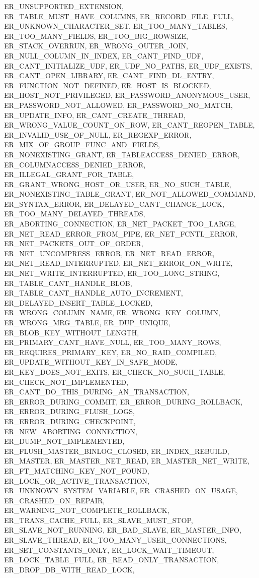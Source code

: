 \documentclass[english,letterpaper]{book}
\begin{document}
\begin{Code}
   ER_UNSUPPORTED_EXTENSION,
   ER_TABLE_MUST_HAVE_COLUMNS,
   ER_RECORD_FILE_FULL,
   ER_UNKNOWN_CHARACTER_SET,
   ER_TOO_MANY_TABLES,
   ER_TOO_MANY_FIELDS,
   ER_TOO_BIG_ROWSIZE,
   ER_STACK_OVERRUN,
   ER_WRONG_OUTER_JOIN,
   ER_NULL_COLUMN_IN_INDEX,
   ER_CANT_FIND_UDF,
   ER_CANT_INITIALIZE_UDF,
   ER_UDF_NO_PATHS,
   ER_UDF_EXISTS,
   ER_CANT_OPEN_LIBRARY,
   ER_CANT_FIND_DL_ENTRY,
   ER_FUNCTION_NOT_DEFINED,
   ER_HOST_IS_BLOCKED,
   ER_HOST_NOT_PRIVILEGED,
   ER_PASSWORD_ANONYMOUS_USER,
   ER_PASSWORD_NOT_ALLOWED,
   ER_PASSWORD_NO_MATCH,
   ER_UPDATE_INFO,
   ER_CANT_CREATE_THREAD,
   ER_WRONG_VALUE_COUNT_ON_ROW,
   ER_CANT_REOPEN_TABLE,
   ER_INVALID_USE_OF_NULL,
   ER_REGEXP_ERROR,
   ER_MIX_OF_GROUP_FUNC_AND_FIELDS,
   ER_NONEXISTING_GRANT,
   ER_TABLEACCESS_DENIED_ERROR,
   ER_COLUMNACCESS_DENIED_ERROR,
   ER_ILLEGAL_GRANT_FOR_TABLE,
   ER_GRANT_WRONG_HOST_OR_USER,
   ER_NO_SUCH_TABLE,
   ER_NONEXISTING_TABLE_GRANT,
   ER_NOT_ALLOWED_COMMAND,
   ER_SYNTAX_ERROR,
   ER_DELAYED_CANT_CHANGE_LOCK,
   ER_TOO_MANY_DELAYED_THREADS,
   ER_ABORTING_CONNECTION,
   ER_NET_PACKET_TOO_LARGE,
   ER_NET_READ_ERROR_FROM_PIPE,
   ER_NET_FCNTL_ERROR,
   ER_NET_PACKETS_OUT_OF_ORDER,
   ER_NET_UNCOMPRESS_ERROR,
   ER_NET_READ_ERROR,
   ER_NET_READ_INTERRUPTED,
   ER_NET_ERROR_ON_WRITE,
   ER_NET_WRITE_INTERRUPTED,
   ER_TOO_LONG_STRING,
   ER_TABLE_CANT_HANDLE_BLOB,
   ER_TABLE_CANT_HANDLE_AUTO_INCREMENT,
   ER_DELAYED_INSERT_TABLE_LOCKED,
   ER_WRONG_COLUMN_NAME,
   ER_WRONG_KEY_COLUMN,
   ER_WRONG_MRG_TABLE,
   ER_DUP_UNIQUE,
   ER_BLOB_KEY_WITHOUT_LENGTH,
   ER_PRIMARY_CANT_HAVE_NULL,
   ER_TOO_MANY_ROWS,
   ER_REQUIRES_PRIMARY_KEY,
   ER_NO_RAID_COMPILED,
   ER_UPDATE_WITHOUT_KEY_IN_SAFE_MODE,
   ER_KEY_DOES_NOT_EXITS,
   ER_CHECK_NO_SUCH_TABLE,
   ER_CHECK_NOT_IMPLEMENTED,
   ER_CANT_DO_THIS_DURING_AN_TRANSACTION,
   ER_ERROR_DURING_COMMIT,
   ER_ERROR_DURING_ROLLBACK,
   ER_ERROR_DURING_FLUSH_LOGS,
   ER_ERROR_DURING_CHECKPOINT,
   ER_NEW_ABORTING_CONNECTION,
   ER_DUMP_NOT_IMPLEMENTED,
   ER_FLUSH_MASTER_BINLOG_CLOSED,
   ER_INDEX_REBUILD,
   ER_MASTER,
   ER_MASTER_NET_READ,
   ER_MASTER_NET_WRITE,
   ER_FT_MATCHING_KEY_NOT_FOUND,
   ER_LOCK_OR_ACTIVE_TRANSACTION,
   ER_UNKNOWN_SYSTEM_VARIABLE,
   ER_CRASHED_ON_USAGE,
   ER_CRASHED_ON_REPAIR,
   ER_WARNING_NOT_COMPLETE_ROLLBACK,
   ER_TRANS_CACHE_FULL,
   ER_SLAVE_MUST_STOP,
   ER_SLAVE_NOT_RUNNING,
   ER_BAD_SLAVE,
   ER_MASTER_INFO,
   ER_SLAVE_THREAD,
   ER_TOO_MANY_USER_CONNECTIONS,
   ER_SET_CONSTANTS_ONLY,
   ER_LOCK_WAIT_TIMEOUT,
   ER_LOCK_TABLE_FULL,
   ER_READ_ONLY_TRANSACTION,
   ER_DROP_DB_WITH_READ_LOCK,

\end{Code}
\end{document}
